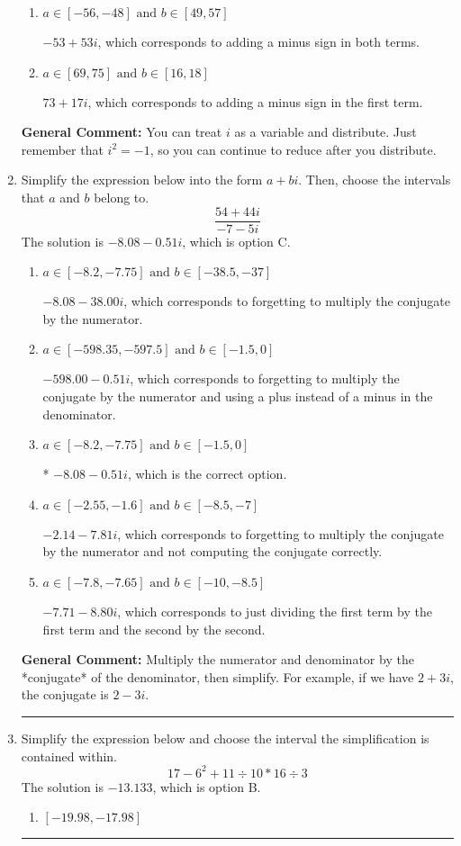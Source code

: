 \documentclass{extbook}[14pt]
\newcommand{\litem}[1]{\item #1

\rule{\textwidth}{0.4pt}}
\begin{document}
\begin{enumerate}
{\begin{enumerate}[label=\Alph*.]
 $73 - 17 i$, which corresponds to adding a minus sign in the second term.
\item \( a \in [-56, -48] \text{ and } b \in [49, 57] \)

 $-53 + 53 i$, which corresponds to adding a minus sign in both terms.
\item \( a \in [69, 75] \text{ and } b \in [16, 18] \)

 $73 + 17 i$, which corresponds to adding a minus sign in the first term.
\end{enumerate}

\textbf{General Comment:} You can treat $i$ as a variable and distribute. Just remember that $i^2=-1$, so you can continue to reduce after you distribute.
}
\litem{
Simplify the expression below into the form $a+bi$. Then, choose the intervals that $a$ and $b$ belong to.
\[ \frac{54 + 44 i}{-7 - 5 i} \]The solution is \( -8.08  - 0.51 i \), which is option C.\begin{enumerate}[label=\Alph*.]
\item \( a \in [-8.2, -7.75] \text{ and } b \in [-38.5, -37] \)

 $-8.08  - 38.00 i$, which corresponds to forgetting to multiply the conjugate by the numerator.
\item \( a \in [-598.35, -597.5] \text{ and } b \in [-1.5, 0] \)

 $-598.00  - 0.51 i$, which corresponds to forgetting to multiply the conjugate by the numerator and using a plus instead of a minus in the denominator.
\item \( a \in [-8.2, -7.75] \text{ and } b \in [-1.5, 0] \)

* $-8.08  - 0.51 i$, which is the correct option.
\item \( a \in [-2.55, -1.6] \text{ and } b \in [-8.5, -7] \)

 $-2.14  - 7.81 i$, which corresponds to forgetting to multiply the conjugate by the numerator and not computing the conjugate correctly.
\item \( a \in [-7.8, -7.65] \text{ and } b \in [-10, -8.5] \)

 $-7.71  - 8.80 i$, which corresponds to just dividing the first term by the first term and the second by the second.
\end{enumerate}

\textbf{General Comment:} Multiply the numerator and denominator by the *conjugate* of the denominator, then simplify. For example, if we have $2+3i$, the conjugate is $2-3i$.
}
\litem{
Simplify the expression below and choose the interval the simplification is contained within.
\[ 17 - 6^2 + 11 \div 10 * 16 \div 3 \]The solution is \( -13.133 \), which is option B.\begin{enumerate}[label=\Alph*.]
\item \( [-19.98, -17.98] \)


\end{enumerate}}
\end{enumerate}
\end{document}
